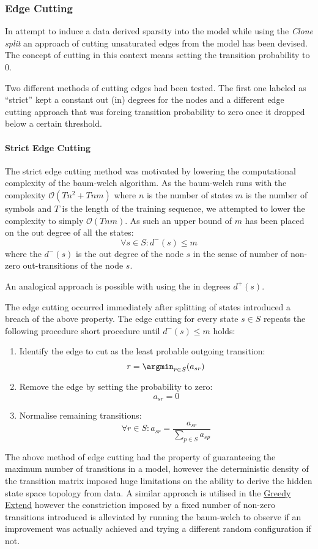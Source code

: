 \subsubsection{Edge Cutting}
In attempt to induce a data derived sparsity into the model while using the \emph{Clone split} an approach of cutting unsaturated edges from the model has been devised. The concept of cutting in this context means setting the transition probability to $0$.

Two different methods of cutting edges had been tested. The first one labeled as ``strict'' kept a constant out (in) degrees for the nodes and a different edge cutting approach that was forcing transition probability to zero once it dropped below a certain threshold.

\paragraph {Strict Edge Cutting}
The strict edge cutting method was motivated by lowering the computational complexity of the \gls{baum-welch} algorithm. As the \gls{baum-welch} runs with the complexity $\mathcal{O}(Tn^2+Tnm)$ where $n$ is the number of states $m$ is the number of symbols and $T$ is the length of the training sequence, we attempted to lower the complexity to simply $\mathcal{O}(Tnm)$. As such an upper bound of $m$ has been placed on the out degree of all the states: $$\forall s\in S: d^-(s) \le m$$ where the $d^-(s)$ is the out degree of the node $s$ in the sense of number of non-zero out-transitions of the node $s$.

An analogical approach is possible with using the in degrees $d^+(s)$.

The edge cutting occurred immediately after splitting of states introduced a breach of the above property. The edge cutting for every state $s\in S$ repeats the following procedure short procedure until $d^-(s) \le m$ holds:
\begin{enumerate}
	\item Identify the edge to cut as the least probable outgoing transition:
	$$r = \argmin_{r\in S}(a_{sr})$$
	\item Remove the edge by setting the probability to zero: $$a_{sr} = 0$$
	\item Normalise remaining transitions:
	$$\forall r \in S: a_{sr} = \frac{a_{sr}}{\sum_{p\in S}a_{sp}}$$
\end{enumerate}

The above method of edge cutting had the property of guaranteeing the maximum number of transitions in a model, however the deterministic density of the transition matrix imposed huge limitations on the ability to derive the hidden state space topology from data. A similar approach is utilised in the \hyperref[sec:greedy_extend]{Greedy Extend} however the constriction imposed by a fixed number of non-zero transitions introduced is alleviated by running the \gls{baum-welch} to observe if an improvement was actually achieved and trying a different random configuration if not.

